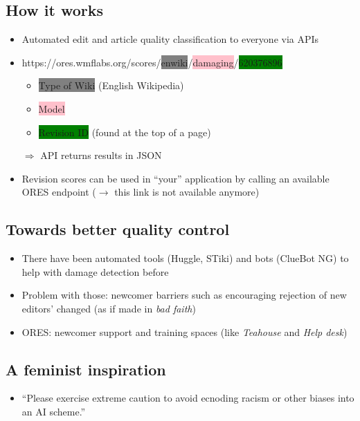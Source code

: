 \documentclass[12pt,a4paper]{article}
\begin{document}
\subsection{How it works}
\begin{itemize}
\item Automated edit and article quality classification to everyone via APIs
\item https://ores.wmflabs.org/scores/\colorbox{gray}{enwiki}/\colorbox{pink}{damaging}/\colorbox{green}{620376896}
\begin{itemize}
\item \colorbox{gray}{Type of Wiki} (English Wikipedia)
\item \colorbox{pink}{Model}
\item \colorbox{green}{Revision ID} (found at the top of a page)
\end{itemize}
\(\Rightarrow\) API returns results in JSON
\item Revision scores can be used in ``your'' application by calling an available ORES endpoint (\(\rightarrow\) this link is not available anymore)
\end{itemize}
\subsection{Towards better quality control}
\begin{itemize}
\item There have been automated tools (Huggle, STiki) and bots (ClueBot NG) to help with damage detection before
\item Problem with those: newcomer barriers such as encouraging rejection of new editors' changed (as if made in \textit{bad faith})
\item ORES: newcomer support and training spaces (like \textit{Teahouse} and \textit{Help desk})
\end{itemize}
\subsection{A feminist inspiration}
\begin{itemize}
\item ``Please exercise extreme caution to avoid ecnoding racism or other biases into an AI scheme.''
\end{itemize}
\end{document}
